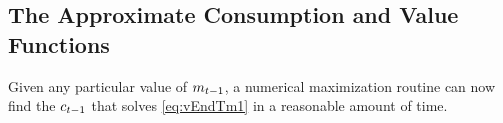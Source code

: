 

\begin{comment}
  In the {\SMDSOPntbk} notebook, the section ``Discretization of the Income Shock Distribution'' provides code that instantiates the \texttt{DiscreteApproximation} class defined in the \texttt{resources} module. This class creates a 7-point discretization of the continuous log-normal distribution of transitory shocks to income by utilizing seven points, where the mean value is $-.5 \sigma^2$, and the standard deviation is $\sigma = .5$.

  A close look at the \texttt{DiscreteApproximation} class and its subclasses should convince you that the code is simply a computational implementation of the mathematical description of equiprobable discrete approximation in this section. Moreover, the Python code generates a graph of the discretized distribution depicted in \ref{fig:discreteapprox}.
\end{comment}

\hypertarget{the-approximate-consumption-and-value-functions}{}
\subsection{The Approximate Consumption and Value Functions}

Given any particular value of ${m}_{t-1}$, a numerical maximization routine can now find the ${c}_{t-1}$ that solves \eqref{eq:vEndTm1} in a reasonable amount of time.

\begin{comment}

\end{comment}

